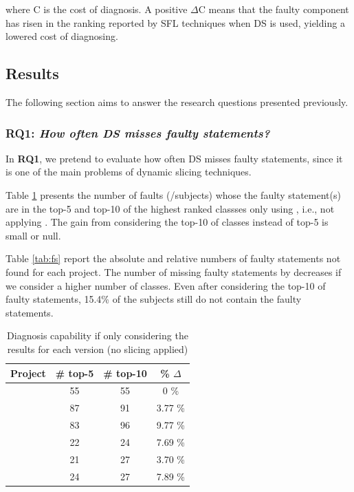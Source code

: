 \documentclass{article}
\begin{document}
where C is the cost of diagnosis. 
A positive $\Delta$C means that the faulty component has risen in
the ranking reported by SFL techniques when DS is used,
yielding a lowered cost of diagnosing.


\subsection{Results}

The following section aims to answer the research questions presented previously.

\subsubsection{RQ1: \textit{How often DS misses faulty statements?}}

In \textbf{RQ1}, we pretend to evaluate how often DS misses faulty statements, since it is one of the main problems of dynamic slicing techniques. 

Table \ref{table:fsws} presents the number of faults (/subjects) whose the faulty statement(s) are in the top-5 and top-10 of the highest ranked classses only using \sfl{}, i.e., not applying \ds{}. The gain from considering the top-10 of classes instead of top-5 is small or null. 

Table \ref{tab:fs} report the absolute and relative numbers of faulty statements not found  for each project. The number of missing faulty statements by \ds{} decreases if we consider a higher number of classes. Even after considering the top-10 of faulty statements, 15.4\% of the subjects still do not contain the faulty statements.

\begin{table}[h]
	\centering
	\setlength{\tabcolsep}{4pt}
	  \begin{tabular}{lccc}
		\toprule
		Project            & \# top-5 & \# top-10  & \% $\Delta$  \\ 
		\midrule
\lang{}            & 55 & 55 & 0 \%       \\   %
		\cmath{}           & 87  & 91 & 3.77 \%     \\   %
		\closure{}         & 83  & 96  & 9.77 \%     \\   %
		\chart{}           & 22  & 24 & 7.69 \%      \\  %
		\jtime{}           & 21  & 27 & 3.70 \%       \\   %
		\mockito{}         & 24  & 27 & 7.89 \%    \\     %
		\bottomrule
	\end{tabular}
  \caption {Diagnosis capability if only considering the \sfl{} results for each version (no slicing applied)}
  \label{table:fsws}
\end{table}  
\end{document}
